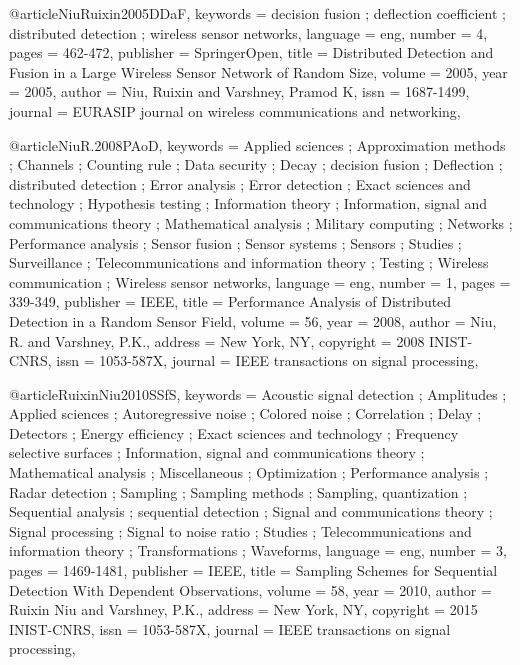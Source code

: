 @article{NiuRuixin2005DDaF,
keywords = {decision fusion ; deflection coefficient ; distributed detection ; wireless sensor networks},
language = {eng},
number = {4},
pages = {462-472},
publisher = {SpringerOpen},
title = {Distributed Detection and Fusion in a Large Wireless Sensor Network of Random Size},
volume = {2005},
year = {2005},
author = {Niu, Ruixin and Varshney, Pramod K},
issn = {1687-1499},
journal = {EURASIP journal on wireless communications and networking},
}

@article{NiuR.2008PAoD,
keywords = {Applied sciences ; Approximation methods ; Channels ; Counting rule ; Data security ; Decay ; decision fusion ; Deflection ; distributed detection ; Error analysis ; Error detection ; Exact sciences and technology ; Hypothesis testing ; Information theory ; Information, signal and communications theory ; Mathematical analysis ; Military computing ; Networks ; Performance analysis ; Sensor fusion ; Sensor systems ; Sensors ; Studies ; Surveillance ; Telecommunications and information theory ; Testing ; Wireless communication ; Wireless sensor networks},
language = {eng},
number = {1},
pages = {339-349},
publisher = {IEEE},
title = {Performance Analysis of Distributed Detection in a Random Sensor Field},
volume = {56},
year = {2008},
author = {Niu, R. and Varshney, P.K.},
address = {New York, NY},
copyright = {2008 INIST-CNRS},
issn = {1053-587X},
journal = {IEEE transactions on signal processing},
}

@article{RuixinNiu2010SSfS,
keywords = {Acoustic signal detection ; Amplitudes ; Applied sciences ; Autoregressive noise ; Colored noise ; Correlation ; Delay ; Detectors ; Energy efficiency ; Exact sciences and technology ; Frequency selective surfaces ; Information, signal and communications theory ; Mathematical analysis ; Miscellaneous ; Optimization ; Performance analysis ; Radar detection ; Sampling ; Sampling methods ; Sampling, quantization ; Sequential analysis ; sequential detection ; Signal and communications theory ; Signal processing ; Signal to noise ratio ; Studies ; Telecommunications and information theory ; Transformations ; Waveforms},
language = {eng},
number = {3},
pages = {1469-1481},
publisher = {IEEE},
title = {Sampling Schemes for Sequential Detection With Dependent Observations},
volume = {58},
year = {2010},
author = {Ruixin Niu and Varshney, P.K.},
address = {New York, NY},
copyright = {2015 INIST-CNRS},
issn = {1053-587X},
journal = {IEEE transactions on signal processing},
}


